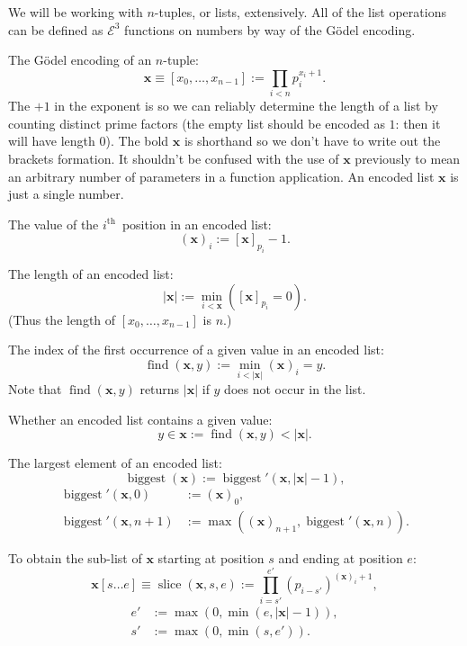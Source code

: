 \documentclass[a4paper]{article}
\newcommand{\grz}[1]{$\mathcal{E}^{#1}$}	%
\newcommand{\ith}{$i^{\textrm{th}}$~}
\newcommand{\xvec}{\mathbf{x}}	%
\newcommand{\recurN}[1]{\begin{equation*} \begin{split} #1 \end{split} \end{equation*}}	%
\newcommand{\find}{\operatorname{find}}
\theoremstyle{plain}
\theoremstyle{definition}
\begin{document}
We will be working with $n$-tuples, or lists, extensively. All of the list operations can be defined as \grz{3} functions on numbers by way of the G\"odel encoding.

The G\"odel encoding of an $n$-tuple:
\begin{equation}\label{eq:ntuple} \xvec \equiv [x_0, \dots, x_{n-1}] := \prod_{i < n} p_i^{x_i+1}. \end{equation}
The $+1$ in the exponent is so we can reliably determine the length of a list by counting distinct prime factors (the empty list should be encoded as $1$: then it will have length $0$).
The bold $\xvec$ is shorthand so we don't have to write out the brackets formation. It shouldn't be confused with the use of $\xvec$ previously to mean an arbitrary number of parameters in a function application. An encoded list $\xvec$ is just a single number.

The value of the \ith position in an encoded list:
\begin{equation} (\xvec)_i := [\xvec]_{p_i} - 1. \end{equation}

The length of an encoded list:
\begin{equation} |\xvec| := \min_{i < \xvec} \left([\xvec]_{p_i} = 0  \right).\end{equation}
(Thus the length of $[x_0,\ldots, x_{n-1}]$ is $n$.)

The index of the first occurrence of a given value in an encoded list:
\begin{equation} \find(\xvec,y) := \min_{i < |\xvec|} (\xvec)_i = y. \end{equation}
Note that $\find(\xvec,y)$ returns $|\xvec|$ if $y$ does not occur in the list.

Whether an encoded list contains a given value:
\begin{equation} y \in \xvec := \find(\xvec,y) < |\xvec|. \end{equation}

The largest element of an encoded list:
\begin{equation} \operatorname{biggest}(\xvec) := \operatorname{biggest}'(\xvec,|\xvec|-1), \end{equation}
\recurN{
	\operatorname{biggest}'(\xvec,0) &:= (\xvec)_0, \\ 
	\operatorname{biggest}'(\xvec,n+1) &:= \max \left ( (\xvec)_{n+1},\operatorname{biggest}'(\xvec,n) \right ).
}

To obtain the sub-list of $\xvec$ starting at position $s$ and ending at position $e$:
\begin{equation} \xvec[s \dots e] \equiv \operatorname{slice}(\xvec,s,e) := \prod_{i=s'}^{e'}(p_{i-s'})^{(\xvec)_i+1}, \end{equation}
\begin{equation*} 
\begin{split}
	e' &:= \max(0,\min(e,|\xvec|-1)), \\ 
	s' &:= \max(0,\min(s,e')). 
\end{split}
\end{equation*}
\end{document}
